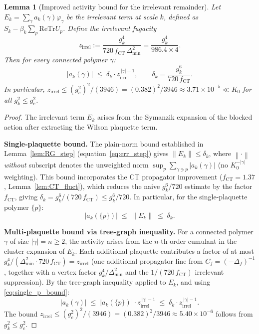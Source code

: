 \documentclass[11pt,a4paper]{amsart}
\newtheorem{lemma}[theorem]{Lemma}
\theoremstyle{definition}
\newcommand{\re}{\mathrm{Re}}
\newcommand{\Tr}{\mathrm{Tr}}
\newcommand{\norm}[1]{\left\|#1\right\|}
\newcommand{\Del}{\Delta_{\min}}
\newcommand{\Cf}{C_f}
\newcommand{\gB}{g^2_c}
\newcommand{\CT}{\mathrm{CT}}
\begin{document}
\begin{lemma}[Improved activity bound for the irrelevant remainder]
\label{lem:irrel_activity}
Let $E_k = \sum_\gamma a_k(\gamma)\varphi_\gamma$ be the irrelevant term at scale $k$,
defined as $S_k - \beta_k\sum_p\re\Tr U_p$.  Define the
\emph{irrelevant fugacity}
\begin{equation}
\label{eq:z_irrel}
  z_{\mathrm{irrel}} := \frac{g^4_k}{720\,f_{\CT}\,\Del^2}
  = \frac{g^4_k}{986.4 \times 4}.
\end{equation}
Then for every connected polymer $\gamma$:
\begin{equation}
\label{eq:irrel_bound}
  |a_k(\gamma)| \;\le\; \delta_k \cdot z_{\mathrm{irrel}}^{\,|\gamma|-1},
  \qquad
  \delta_k = \frac{g^6_k}{720\,f_{\CT}}.
\end{equation}
In particular, $z_{\mathrm{irrel}} \le (g^2_c)^2/(3946) = (0.382)^2/3946 \approx 3.71\times 10^{-5} \ll K_0$
for all $g^2_k \le \gB$.
\end{lemma}
\begin{proof}
The irrelevant term $E_k$ arises from the Symanzik expansion of the blocked
action after extracting the Wilson plaquette term.

\textbf{Single-plaquette bound.}
The plain-norm bound established in Lemma~\ref{lem:RG_step}
(equation~\eqref{eq:err_step}) gives $\norm{E_k} \le \delta_k$,
where $\norm{\cdot}$ \emph{without} subscript denotes the unweighted norm
$\sup_p\sum_{\gamma\ni p}|a_k(\gamma)|$ (no $K_0^{-|\gamma|}$ weighting).
This bound incorporates the CT propagator improvement ($f_{\CT} = 1.37$,
Lemma~\ref{lem:CT_fluct}), which reduces the naive $g^6_k/720$ estimate
by the factor $f_{\CT}$, giving $\delta_k = g^6_k/(720\,f_{\CT})
\le g^6_k/720$.
In particular, for the single-plaquette polymer $\{p\}$:
\begin{equation}
\label{eq:single_p_bound}
  |a_k(\{p\})| \;\le\; \norm{E_k} \;\le\; \delta_k.
\end{equation}

\textbf{Multi-plaquette bound via tree-graph inequality.}
For a connected polymer $\gamma$ of size $|\gamma| = n \ge 2$, the activity
arises from the $n$-th order cumulant in the cluster expansion of $E_k$.
Each additional plaquette contributes a factor of at most
$g^4_k/(\Del^2 \cdot 720\,f_{\CT}) = z_{\mathrm{irrel}}$
(one additional propagator line from $\Cf = (-\Delta_f)^{-1}$,
together with a vertex factor $g^4_k/\Del^2$ and the $1/(720\,f_{\CT})$
irrelevant suppression).
By the tree-graph inequality \cite[Prop.~2.3]{B87} applied to $E_k$,
and using \eqref{eq:single_p_bound}:
\[
  |a_k(\gamma)| \;\le\; |a_k(\{p\})| \cdot z_{\mathrm{irrel}}^{\,|\gamma|-1}
  \;\le\; \delta_k \cdot z_{\mathrm{irrel}}^{\,|\gamma|-1}.
\]
The bound $z_{\mathrm{irrel}} \le (g^2_c)^2/(3946) = (0.382)^2/3946 \approx 5.40\times 10^{-6}$
follows from $g^2_k \le \gB$.
\end{proof}
\end{document}
